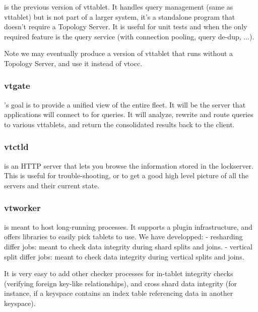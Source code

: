   is the previous version of vttablet. It handles query management
(same as vttablet) but is not part of a larger system, it's a standalone
program that doesn't require a Topology Server. It is useful for
unit tests and when the only required feature is the query service
(with connection pooling, query de-dup, ...).

Note we may eventually produce a version of vttablet that runs
without a Topology Server, and use it instead of vtocc.

\subsubsection{vtgate}\hypertarget{vtgate}{}\label{vtgate}

's goal is to provide a unified view of the entire fleet.
It will be the server that applications will connect to for
queries. It will analyze, rewrite and route queries to various
vttablets, and return the consolidated results back to the client.

\subsubsection{vtctld}\hypertarget{vtctld}{}\label{vtctld}

  is an HTTP server that lets you browse the information stored
in the lockserver.
This is useful for trouble-shooting, or to get a good high
level picture of all the servers and their current state.

\subsubsection{vtworker}\hypertarget{vtworker}{}\label{vtworker}

  is meant to host long-running processes. It supports a plugin infrastructure, and offers libraries to easily pick tablets to use. We have developped:
- resharding differ jobs: meant to check data integrity during shard splits and joins.
- vertical split differ jobs: meant to check data integrity during vertical splits and joins.

It is very easy to add other checker processes for in-tablet integrity checks (verifying foreign key-like relationships), and cross shard data integrity (for instance, if a keyspace contains an index table referencing data in another keyspace).

